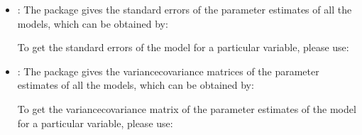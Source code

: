 \documentclass[letterpaper,10pt,english]{sphinxmanual}
\begin{document}
\begin{itemize}
\item {} 
\sphinxAtStartPar
{}: The package gives the standard errors of the parameter estimates of all the models, which can be obtained by:
\begin{quote}

\begin{sphinxVerbatim}[commandchars=\\\{\}]
  \PYG{p}{[}\PYG{p}{]}
\end{sphinxVerbatim}
\end{quote}

\sphinxAtStartPar
To get the standard errors of the model for a particular variable, please use:
\begin{quote}

\begin{sphinxVerbatim}[commandchars=\\\{\}]
  \PYG{p}{[}\PYG{p}{]}\PYG{p}{[}\PYG{p}{]}
\end{sphinxVerbatim}
\end{quote}

\item {} 
\sphinxAtStartPar
{}: The package gives the variance\sphinxhyphen{}covariance matrices of the parameter estimates of all the models,
which can be obtained by:
\begin{quote}

\begin{sphinxVerbatim}[commandchars=\\\{\}]
  \PYG{p}{[}\PYG{p}{]}
\end{sphinxVerbatim}
\end{quote}

\sphinxAtStartPar
To get the variance\sphinxhyphen{}covariance matrix of the parameter estimates of the model for a particular variable, please use:
\begin{quote}

\begin{sphinxVerbatim}[commandchars=\\\{\}]
  \PYG{p}{[}\PYG{p}{]}\PYG{p}{[}\PYG{p}{]}
\end{sphinxVerbatim}
\end{quote}


\end{itemize}
\end{document}
